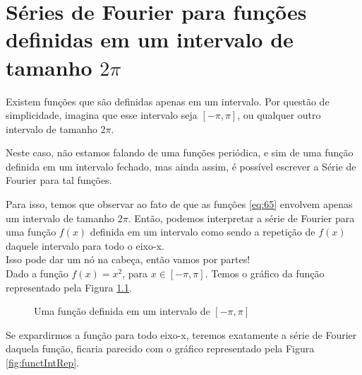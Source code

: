 \chapter{Séries de Fourier para funções definidas em um intervalo de tamanho $2\pi$}

Existem funções que são definidas apenas em um intervalo. Por questão de 
simplicidade, imagina que esse intervalo seja $[-\pi, \pi]$, ou qualquer
outro intervalo de tamanho $2\pi$.

Neste caso, não estamos falando de uma funções periódica, e sim de uma 
função definida em um intervalo fechado, mas ainda assim, é possível
escrever a Série de Fourier para tal funções.

Para isso, temos que observar ao fato de que as funções \ref{eq:65}
envolvem apenas um intervalo de tamanho $2\pi$. Então, podemos 
interpretar a série de Fourier para uma função $f(x)$ definida 
em um intervalo como sendo a repetição de $f(x)$ daquele intervalo
para todo o eixo-x.
\\

Isso pode dar um nó na cabeça, então vamos por partes!
\\

Dado a função $f(x) = x^2$, para $x \in [-\pi,\pi]$. Temos o gráfico da 
função representado pela Figura \ref{fig:functInt}.

\begin{figure}[H]

    \caption{Uma função definida em um intervalo de $[-\pi, \pi]$}
    \label{fig:functInt}
\end{figure}

Se expardirmos a função para todo eixo-x, teremos exatamente a série
de Fourier daquela função, ficaria parecido com o gráfico representado 
pela Figura \ref{fig:functIntRep}.

